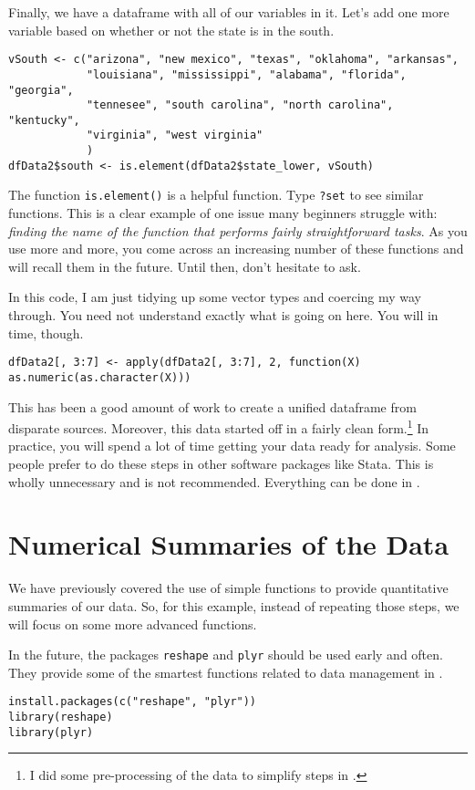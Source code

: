 Finally, we have a dataframe with all of our variables in it. Let's
add one more variable based on whether or not the state is in the
south.
\begin{verbatim}
vSouth <- c("arizona", "new mexico", "texas", "oklahoma", "arkansas",
            "louisiana", "mississippi", "alabama", "florida", "georgia",
            "tennesee", "south carolina", "north carolina", "kentucky",
            "virginia", "west virginia"
            )
dfData2$south <- is.element(dfData2$state_lower, vSouth)
\end{verbatim}

The function \texttt{is.element()} is a helpful function. Type
\texttt{?set} to see similar functions. This is a clear example of one
issue many \R{} beginners struggle with: \textit{finding the name of
  the function that performs fairly straightforward tasks}. As you use
\R{} more and more, you come across an increasing number of these
functions and will recall them in the future. Until then, don't
hesitate to ask.

In this code, I am just tidying up some vector types and coercing my
way through. You need not understand exactly what is going on
here. You will in time, though.
\begin{verbatim}
dfData2[, 3:7] <- apply(dfData2[, 3:7], 2, function(X) as.numeric(as.character(X)))
\end{verbatim}

This has been a good amount of work to create a unified dataframe from
disparate sources. Moreover, this data started off in a fairly clean
form.\footnote{I did some pre-processing of the data to simplify steps
  in \R{}.} In practice, you will spend a lot of time getting your
data ready for analysis. Some people prefer to do these steps in other
software packages like Stata. This is wholly unnecessary and is not
recommended. Everything can be done in \R{}.

\section{Numerical Summaries of the Data}

We have previously covered the use of simple functions to provide
quantitative summaries of our data. So, for this example, instead of
repeating those steps, we will focus on some more advanced functions.

In the future, the packages \texttt{reshape} and \texttt{plyr} should
be used early and often. They provide some of the smartest functions
related to data management in \R{}.
\begin{verbatim}
install.packages(c("reshape", "plyr"))
library(reshape)
library(plyr)
\end{verbatim}

